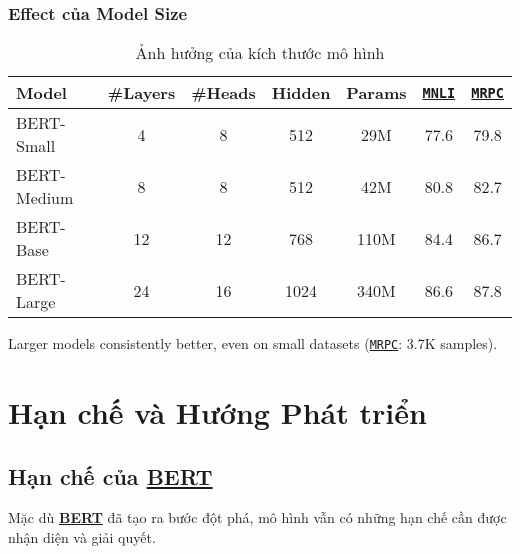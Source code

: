\subsubsection{Effect của Model Size}
\begin{table}[H]
    \centering
    \caption{Ảnh hưởng của kích thước mô hình}
    \label{tab:model_size_effect}
    \begin{tabular}{lcccccc}
        \toprule
        \textbf{Model} & \textbf{\#Layers} & \textbf{\#Heads} & \textbf{Hidden} & \textbf{Params} & \textbf{\hyperref[acro:mnli]{\texttt{MNLI}}} & \textbf{\hyperref[acro:mrpc]{\texttt{MRPC}}} \\
        \midrule
        BERT-Small & 4 & 8 & 512 & 29M & 77.6 & 79.8 \\
        BERT-Medium & 8 & 8 & 512 & 42M & 80.8 & 82.7 \\
        BERT-Base & 12 & 12 & 768 & 110M & 84.4 & 86.7 \\
        BERT-Large & 24 & 16 & 1024 & 340M & 86.6 & 87.8 \\
        \bottomrule
    \end{tabular}
\end{table}

Larger models consistently better, even on small datasets (\hyperref[acro:mrpc]{\texttt{MRPC}}: 3.7K samples).
\section{Hạn chế và Hướng Phát triển}
\label{sec:han_che_huong_phat_trien}

\subsection{Hạn chế của \hyperref[acro:bert]{\textbf{BERT}}}
\label{ssec:han_che_bert}
Mặc dù \hyperref[acro:bert]{\textbf{BERT}} đã tạo ra bước đột phá, mô hình vẫn có những hạn chế cần được nhận diện và giải quyết.
